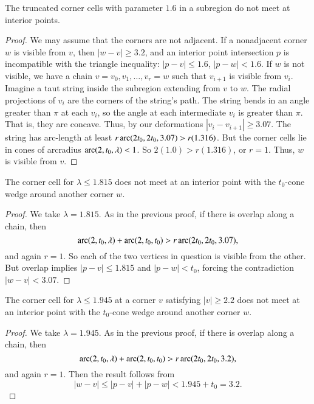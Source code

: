\begin{lemma}
The truncated corner cells with parameter $1.6$ in a subregion do
not meet at interior points.
\end{lemma}

\begin{proof}
We may assume that the corners are not adjacent. If a nonadjacent
corner $w$ is visible from $v$, then $|w-v|\ge3.2$, and an
interior point intersection $p$ is incompatible with the triangle
inequality: $|p-v|\le 1.6$, $|p-w|<1.6$. If $w$ is not visible, we
have a chain $v=v_0,v_1,\ldots,v_r=w$ such that $v_{i+1}$ is
visible from $v_i$. Imagine a taut string inside the subregion
extending from $v$ to $w$. The radial projections of $v_i$ are the
corners of the string's path.   The string bends in an angle
greater than $\pi$ at each $v_i$, so the angle at each
intermediate $v_i$ is greater than $\pi$. That is, they are
concave. Thus, by our deformations $|v_i-v_{i+1}|\ge3.07$. The
string has arc-length at least $r \operatorname{arc}(2t_0,2t_0,3.07)>r (1.316)$.
But the corner cells lie in cones of arcradius
$\operatorname{arc}(2,t_0,\lambda)< 1$. So $2(1.0)>r(1.316)$, or $r=1$.  Thus,
$w$ is visible from $v$.
\end{proof}

\begin{lemma}
The corner cell for $\lambda \le 1.815$ does not meet at an
interior point with the $t_0$-cone wedge around another corner
$w$.
\end{lemma}

\begin{proof}
We take $\lambda=1.815$. As in the previous proof, if there is overlap
along a chain, then
    $$\operatorname{arc}(2,t_0,\lambda) +\operatorname{arc}(2,t_0,t_0) > r \operatorname{arc}(2t_0,2t_0,3.07),$$
and again $r=1$.  So each of the two vertices in question is visible
from the other. But overlap implies $|p-v|\le1.815$ and $|p-w|<t_0$,
forcing the contradiction $|w-v|<3.07$.
\end{proof}

\begin{lemma}
The corner cell for $\lambda \le 1.945$ at a corner $v$ satisfying
$|v|\ge2.2$ does not meet at an interior point with the $t_0$-cone
wedge around another corner $w$.
\end{lemma}

\begin{proof}
We take $\lambda=1.945$. As in the previous proof, if there is overlap
along a chain, then
    $$\operatorname{arc}(2,t_0,\lambda) +\operatorname{arc}(2,t_0,t_0) > r \operatorname{arc}(2t_0,2t_0,3.2),$$
and again $r=1$.  Then the result follows from
    $$|w-v|\le |p-v|+|p-w| < 1.945 + t_0 = 3.2.$$
\end{proof}

